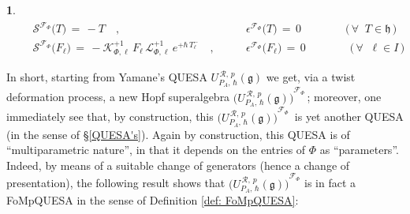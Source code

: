 \documentclass[12pt,reqno,twoside,a4paper]{amsart}
\numberwithin{equation}{section}
\theoremstyle{definition}
\newtheorem{free text}[lema]{}
\theoremstyle{remark}
\newcommand{\R}{{\mathcal R}}
\newcommand{\F}{{\mathcal F}}
\def \K {\mathcal{K}}
\def \L {\mathcal{L}}
\def \SS {\mathcal{S}}
\def \lieg{\mathfrak{g}}
\def \lieh{\mathfrak{h}}
\theoremstyle{plain}
\begin{document}
\begin{free text}
$$\begin{matrix}
%
   \qquad
 \SS^{\F_\Phi}\big(T\big)  \, = \,  -T  \quad ,  \phantom{\Big|^|}
  &  \qquad
 \epsilon^{\F_\Phi}\big(T\big) \, = \, 0   \qquad \qquad  \big(\, \forall \;\; T \in \lieh \,\big)
 \\
%
   \qquad   \SS^{\F_\Phi}\big(F_\ell\big)  \, = \,
   - \K_{\Phi, \ell}^{+1} \, F_\ell \, \L_{\Phi, \ell}^{+1} \, e^{+\hbar \, T^-_\ell}  \quad ,
   &  \qquad  \epsilon^{\F_\Phi}\big(F_\ell\big) \, = \, 0   \qquad \qquad  \big(\, \forall \;\; \ell \in I \,\big)
%
\end{matrix}  $$
%
             \par
   In short, starting from Yamane's QUESA  $ U_{P_A,\,\hbar}^{\,\R,\,p}(\lieg) $  we get,
   via a twist deformation process, a new Hopf superalgebra  $ {\big( U_{P_A,\,\hbar}^{\,\R,\,p}(\lieg) \big)}^{\F_\Phi} \, $;
   moreover, one immediately see that, by construction, this  $ {\big( U_{P_A,\,\hbar}^{\,\R,\,p}(\lieg) \big)}^{\F_\Phi} \, $
   is yet another QUESA (in the sense of  \S \ref{QUESA's}).
   Again by construction, this QUESA is of ``multiparametric nature'', in that it depends on the entries of
   $ \Phi $  as ``parameters''.  Indeed, by means of a suitable change of generators
   (hence a change of presentation), the following result shows that
   $ {\big( U_{P_A,\,\hbar}^{\,\R,\,p}(\lieg) \big)}^{\F_\Phi} $
   is in fact a FoMpQUESA in the sense of  Definition \ref{def: FoMpQUESA}:
%
\end{free text}

\vskip9pt
\end{document}

